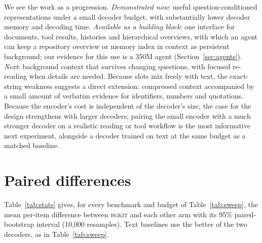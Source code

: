 \documentclass[11pt]{article}
\newcommand{\bgkit}{\textsc{bgkit}}
\begin{document}
We see the work as a progression. \emph{Demonstrated now}: useful question-conditioned representations
under a small decoder budget, with substantially lower decoder memory and decoding time.
\emph{Available as a building block}: one interface for documents, tool results, histories and
hierarchical overviews, with which an agent can keep a repository overview or memory index in context
as persistent background; our evidence for this use is a 350M agent (Section~\ref{sec:agents}).
\emph{Next}: background context that survives changing questions, with focused re-reading when
details are needed. Because slots mix freely with text, the exact-string weakness suggests a direct
extension: compressed context accompanied by a small amount of verbatim evidence for identifiers,
numbers and quotations. Because the encoder's cost is independent of the decoder's size, the case for
the design strengthens with larger decoders; pairing the small encoder with a much stronger decoder on
a realistic reading or tool workflow is the most informative next experiment, alongside a decoder
trained on text at the same budget as a matched baseline.




\appendix
\section{Paired differences}
\label{app:stats}

Table~\ref{tab:stats} gives, for every benchmark and budget of Table~\ref{tab:sweep}, the mean
per-item difference between \bgkit{} and each other arm with its 95\% paired-bootstrap interval
(10{,}000 resamples). Text baselines use the better of the two decoders, as in
Table~\ref{tab:sweep}.

\begin{table}[ht]
\centering
\scriptsize
\resizebox{\linewidth}{!}{}
\caption{\bgkit{} minus each arm: mean per-item difference and 95\% paired-bootstrap interval. Bold:
the interval excludes zero. Full context: the original decoder reading the whole context (not
budget-matched), on the items shared with the sweep.}
\label{tab:stats}
\end{table}
\end{document}
